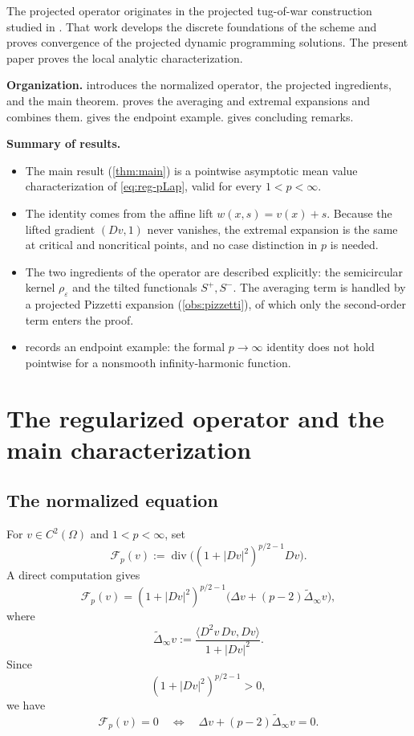 \documentclass[12pt,reqno]{amsart}
\numberwithin{equation}{section}
\theoremstyle{plain}
\theoremstyle{definition}
\theoremstyle{remark}
\newcommand{\Sp}{S^+}
\newcommand{\Sm}{S^-}
\newcommand{\rhoeps}{\rho_\varepsilon}
\newcommand{\DeltaiR}{\widetilde\Delta_\infty}
\newcommand{\Reg}{\mathcal{F}}
\begin{document}
The projected operator originates in the projected tug-of-war construction
studied in \cite{Moosavi26}. That work develops the discrete foundations
of the scheme and proves convergence of the projected dynamic programming
solutions. The present paper proves the local analytic characterization.

\medskip
\noindent\textbf{Organization.}
 introduces the normalized operator, the projected
ingredients, and the main theorem.  proves the averaging
and extremal expansions and combines them.  gives the
endpoint example.  gives concluding remarks.


\medskip
\noindent\textbf{Summary of results.}
\begin{itemize}[leftmargin=1.6em]
\item The main result (\cref{thm:main}) is a pointwise asymptotic mean
value characterization of \eqref{eq:reg-pLap}, valid for every
$1<p<\infty$.
\item The identity comes from the affine lift $w(x,s)=v(x)+s$. Because the
lifted gradient $(Dv,1)$ never vanishes, the extremal expansion is the same
at critical and noncritical points, and no case distinction in $p$ is
needed.
\item The two ingredients of the operator are described explicitly: the
semicircular kernel $\rhoeps$ and the tilted functionals $\Sp,\Sm$. The
averaging term is handled by a projected Pizzetti expansion
(\cref{obs:pizzetti}), of which only the second-order term enters the
proof.
\item {} records an endpoint example: the formal
$p\to\infty$ identity does not hold pointwise for a nonsmooth
infinity-harmonic function.
\end{itemize}
\section{The regularized operator and the main characterization}
\label{sec:char}

\subsection{The normalized equation}
\label{subsec:operator}

For $v\in C^2(\Omega)$ and $1<p<\infty$, set
\[
  \Reg_p(v)
  :=
  \operatorname{div}
  \bigl((1+|Dv|^2)^{p/2-1}Dv\bigr).
\]
A direct computation gives
\begin{equation}\label{eq:decomp}
  \Reg_p(v)
  =
  (1+|Dv|^2)^{p/2-1}
  \bigl(\Delta v+(p-2)\DeltaiR v\bigr),
\end{equation}
where
\[
  \DeltaiR v
  :=
  \frac{\langle D^2v\,Dv,Dv\rangle}{1+|Dv|^2}.
\]
Since
\[
  (1+|Dv|^2)^{p/2-1}>0,
\]
we have
\[
  \Reg_p(v)=0
  \quad\Longleftrightarrow\quad
  \Delta v+(p-2)\DeltaiR v=0.
\]
\end{document}
